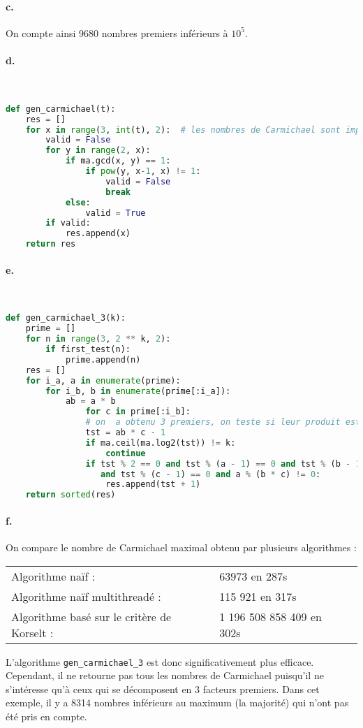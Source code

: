\documentclass[french]{article}
\begin{document}
\paragraph{c.} On compte ainsi 9680 nombres premiers inférieurs à $10^5$.

\paragraph{d.} \
\begin{lstlisting}[language=Python, belowskip=-1 \baselineskip]
def gen_carmichael(t):
    res = []
    for x in range(3, int(t), 2):  # les nombres de Carmichael sont impairs
        valid = False
        for y in range(2, x):
            if ma.gcd(x, y) == 1:
                if pow(y, x-1, x) != 1:
                    valid = False
                    break
            else:
                valid = True
        if valid:
            res.append(x)
    return res
\end{lstlisting}

\paragraph{e.} \
\begin{lstlisting}[language=Python, belowskip=-1 \baselineskip]
def gen_carmichael_3(k):
    prime = []
    for n in range(3, 2 ** k, 2):
        if first_test(n):
            prime.append(n)
    res = []
    for i_a, a in enumerate(prime):
        for i_b, b in enumerate(prime[:i_a]):
            ab = a * b
                for c in prime[:i_b]:
                # on  a obtenu 3 premiers, on teste si leur produit est Carmichael
                tst = ab * c - 1
                if ma.ceil(ma.log2(tst)) != k:
                    continue
                if tst % 2 == 0 and tst % (a - 1) == 0 and tst % (b - 1) == 0 
                   and tst % (c - 1) == 0 and a % (b * c) != 0:
                    res.append(tst + 1)
    return sorted(res)
\end{lstlisting}
\paragraph{f.} On compare le nombre de Carmichael maximal obtenu par plusieurs algorithmes :\\
\begin{center}
    
    \begin{tabular}{lll}
        Algorithme naïf :&63973 en 287s\\
        Algorithme naïf multithreadé : & 115 921 en 317s\\
        Algorithme basé sur le critère de Korselt : &1 196 508 858 409 en 302s\\
    \end{tabular}
    
\end{center}
L'algorithme \verb*|gen_carmichael_3| est donc significativement plus efficace. Cependant, il ne retourne pas tous les nombres de Carmichael puisqu'il ne s'intéresse qu'à ceux qui se décomposent en 3 facteurs premiers. Dans cet exemple, il y a 8314 nombres inférieurs au maximum (la majorité) qui n'ont pas été pris en compte.
\end{document}
